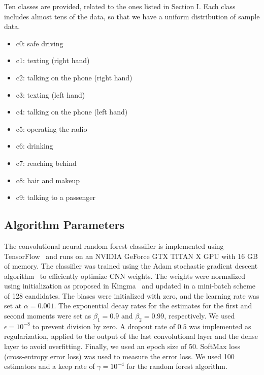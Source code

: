 Ten classes are provided, related to the ones listed in Section I\@. Each class includes almost tens of the data, so that we have a uniform distribution of sample data.

\begin{itemize}
\item c0: safe driving
\item c1: texting (right hand)
\item c2: talking on the phone (right hand)
\item c3: texting (left hand)
\item c4: talking on the phone (left hand)
\item c5: operating the radio
\item c6: drinking
\item c7: reaching behind
\item c8: hair and makeup
\item c9: talking to a passenger
\end{itemize}


\subsection{Algorithm Parameters}
The convolutional neural random forest classifier is implemented using TensorFlow~\cite{abadi_tensorflowlarge_2016} and runs on an NVIDIA GeForce GTX TITAN X GPU with 16 GB of memory. The classifier was trained using the Adam stochastic gradient descent algorithm~\cite{kingma_Adam_2014} to efficiently optimize CNN weights. The weights were normalized using initialization as proposed in Kingma~\cite{kingma_Adam_2014} and updated in a mini-batch scheme of 128 candidates. The biases were initialized with zero, and the learning rate was set at $\alpha = 0.001 $. The exponential decay rates for the estimates for the first and second moments were set as $\beta_1 = 0.9 $ and $\beta_2 = 0.99 $, respectively. We used $\epsilon = {10}^{-8} $ to prevent division by zero. A dropout rate of $0.5 $ was implemented as regularization, applied to the output of the last convolutional layer and the dense layer to avoid overfitting. Finally, we used an epoch size of 50.  SoftMax loss (cross-entropy error loss) was used to measure the error loss. We used 100 estimators and a keep rate of $\gamma = {10}^{-4} $ for the random forest algorithm.


